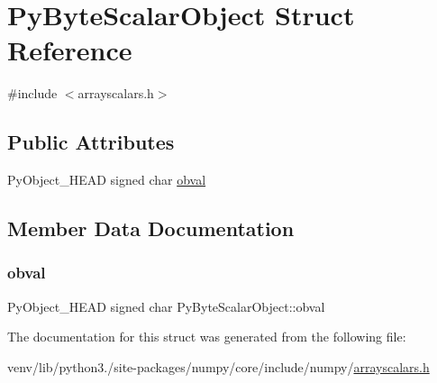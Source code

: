 \hypertarget{structPyByteScalarObject}{}\section{Py\+Byte\+Scalar\+Object Struct Reference}
\label{structPyByteScalarObject}


{\ttfamily \#include $<$arrayscalars.\+h$>$}

\subsection*{Public Attributes}
\begin{DoxyCompactItemize}
\item 
Py\+Object\+\_\+\+H\+E\+AD signed char \hyperlink{structPyByteScalarObject_aa696cbf2e62bfcf23743872d4a30c37a}{obval}
\end{DoxyCompactItemize}


\subsection{Member Data Documentation}
\mbox{\label{structPyByteScalarObject_aa696cbf2e62bfcf23743872d4a30c37a}} 
\subsubsection{\texorpdfstring{obval}{obval}}
{\footnotesize\ttfamily Py\+Object\+\_\+\+H\+E\+AD signed char Py\+Byte\+Scalar\+Object\+::obval}



The documentation for this struct was generated from the following file\+:\begin{DoxyCompactItemize}
\item 
venv/lib/python3./site-\/packages/numpy/core/include/numpy/\hyperlink{arrayscalars_8h}{arrayscalars.\+h}\end{DoxyCompactItemize}
